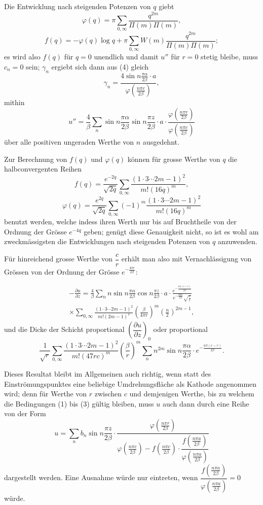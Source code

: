 \documentclass[12pt,a4paper]{book}
\theoremstyle{definition}
\theoremstyle{remark}
\begin{document}
Die Entwicklung nach steigenden Potenzen von $q$ giebt
\[
\varphi(q) = \pi \sum_{0,\infty} \frac{q^{2m}}{\Pi(m)\Pi(m)},
\]
\[
f(q) = -\varphi(q) \log q + \pi \sum_{0,\infty} W(m) \frac{q^{2m}}{\Pi(m)\Pi(m)};
\]
es wird also $f(q)$ für $q = 0$ unendlich und damit $u''$ für $r = 0$ stetig bleibe, muss $c_n = 0$ sein; $\gamma_n$ ergiebt sich dann aus (4) gleich
\[
\gamma_n = \frac{4 \sin n\frac{\pi \alpha}{2\beta} \cdot a}{\varphi\left(\frac{n\pi c}{2\beta}\right)},
\]
mithin
\[
u'' = \frac{4}{\beta} \sum_n \sin n\frac{\pi \alpha}{2\beta} \sin n\frac{\pi z}{2\beta} \cdot a \cdot \frac{\varphi\left(\frac{n\pi r}{2\beta}\right)}{\varphi\left(\frac{n\pi c}{2\beta}\right)}
\]
über alle positiven ungeraden Werthe von $n$ ausgedehnt.

Zur Berechnung von $f(q)$ und $\varphi(q)$ können für grosse Werthe von $q$ die halbconvergenten Reihen
\[
f(q) = \frac{e^{-2q}}{\sqrt{2q}} \sum_{0,\infty} \frac{(1 \cdot 3 \cdots 2m - 1)^2}{m! (16q)^m},
\]
\[
\varphi(q) = \frac{e^{2q}}{\sqrt{2q}} \sum_{0,\infty} (-1)^m \frac{(1 \cdot 3 \cdots 2m - 1)^2}{m! (16q)^m}
\]
benutzt werden, welche indess ihren Werth nur bis auf Bruchtheile von der Ordnung der Grösse $e^{-4q}$ geben; genügt diese Genauigkeit nicht, so ist es wohl am zweckmässigsten die Entwicklungen nach steigenden Potenzen von $q$ anzuwenden.

Für hinreichend grosse Werthe von $\dfrac{c}{r}$ erhält man also mit Vernachlässigung von Grössen von der Ordnung der Grösse $e^{-\frac{4\pi r}{2\beta}}$:

\begin{multline*}
-\frac{\partial u}{\partial z} = \frac{4}{\beta} \sum_n n \sin n\frac{\pi \alpha}{2\beta} \cos n\frac{\pi z}{2\beta} \cdot a \cdot \frac{e^{-\frac{n\pi(c-r)}{2\beta}}}{e^{-\frac{n\pi c}{2\beta}} \sqrt{\frac{c}{r}}}\\
\times \sum_{0,\infty} \frac{(1 \cdot 3 \cdots 2m - 1)^2}{m! (2m - 1)^2} \left(\frac{\beta}{4\pi r}\right)^m \left(\frac{n}{2}\right)^{2m-1},
\end{multline*}
und die Dicke der Schicht proportional $\left(\dfrac{\partial u}{\partial z}\right)_0$ oder proportional
\[
\frac{1}{\sqrt{r}} \sum_{0,\infty} \frac{(1 \cdot 3 \cdots 2m - 1)^2}{m! (47rc)^m} \left(\frac{\beta}{r}\right)^m \sum_n n^{2m} \sin n\frac{\pi \alpha}{2\beta} \cdot e^{-\frac{n\pi(c-r)}{2\beta}}.
\]

Dieses Resultat bleibt im Allgemeinen auch richtig, wenn statt des Einströmungspunktes eine beliebige Umdrehungsfläche als Kathode angenommen wird; denn für Werthe von $r$ zwischen $c$ und demjenigen Werthe, bis zu welchem die Bedingungen (1) bis (3) gültig bleiben, muss $u$ auch dann durch eine Reihe von der Form
\[
u = \sum_n b_n \sin n\frac{\pi z}{2\beta} \cdot \frac{\varphi\left(\frac{n\pi r}{2\beta}\right)}{\varphi\left(\frac{n\pi c}{2\beta}\right) - f\left(\frac{n\pi c}{2\beta}\right) \cdot \dfrac{f\left(\frac{n\pi a}{2\beta}\right)}{\varphi\left(\frac{n\pi a}{2\beta}\right)}}
\]
dargestellt werden. Eine Ausnahme würde nur eintreten, wenn $\dfrac{f\left(\frac{n\pi a}{2\beta}\right)}{\varphi\left(\frac{n\pi a}{2\beta}\right)} = 0$ würde.
\end{document}
